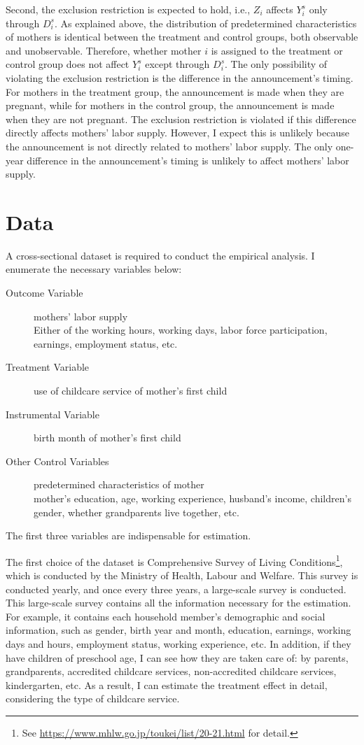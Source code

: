 \documentclass[12pt]{article}
\begin{document}
Second, the exclusion restriction is expected to hold, i.e., $Z_i$ affects $Y_i^s$ only through $D_i^s$.
As explained above, the distribution of predetermined characteristics of mothers is identical between the treatment and control groups, both observable and unobservable.
Therefore, whether mother $i$ is assigned to the treatment or control group does not affect $Y_i^s$ except through $D_i^s$.
The only possibility of violating the exclusion restriction is the difference in the announcement's timing. 
For mothers in the treatment group, the announcement is made when they are pregnant, while for mothers in the control group, the announcement is made when they are not pregnant.
The exclusion restriction is violated if this difference directly affects mothers' labor supply.
However, I expect this is unlikely because the announcement is not directly related to mothers' labor supply.
The only one-year difference in the announcement's timing is unlikely to affect mothers' labor supply.

\section{Data}
A cross-sectional dataset is required to conduct the empirical analysis.
I enumerate the necessary variables below: 
\begin{description}
  \item[Outcome Variable] mothers' labor supply \\ 
  Either of the working hours, working days, labor force participation, earnings, employment status, etc.
  \item[Treatment Variable] use of childcare service of mother's first child 
  \item[Instrumental Variable] birth month of mother's first child
  \item[Other Control Variables] predetermined characteristics of mother \\
  mother's education, age, working experience, husband's income, children's gender, whether grandparents live together, etc.
\end{description}
The first three variables are indispensable for estimation. 


The first choice of the dataset is Comprehensive Survey of Living Conditions\footnote{See \url{https://www.mhlw.go.jp/toukei/list/20-21.html} for detail.}, which is conducted by the Ministry of Health, Labour and Welfare.
This survey is conducted yearly, and once every three years, a large-scale survey is conducted.
This large-scale survey contains all the information necessary for the estimation.
For example, it contains each household member's demographic and social information, such as gender, birth year and month, education, earnings, working days and hours, employment status, working experience, etc.
In addition, if they have children of preschool age, I can see how they are taken care of: by parents, grandparents, accredited childcare services, non-accredited childcare services, kindergarten, etc. 
As a result, I can estimate the treatment effect in detail, considering the type of childcare service.
\end{document}
